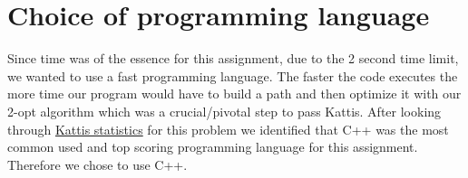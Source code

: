 \documentclass{article}[11pt, a4paper]
\begin{document}
\section{Choice of programming language}
Since time was of the essence for this assignment, due to the 2 second time limit, we wanted to use a fast programming language. The faster the code executes the more time our program would have to build a path and then optimize it with our 2-opt algorithm which was a crucial/pivotal step to pass Kattis. After looking through \href{https://kth.kattis.com/problems/tsp/statistics}{Kattis statistics} for this problem we identified that C++ was the most common used and top scoring programming language for this assignment. Therefore we chose to use C++.
\end{document}
